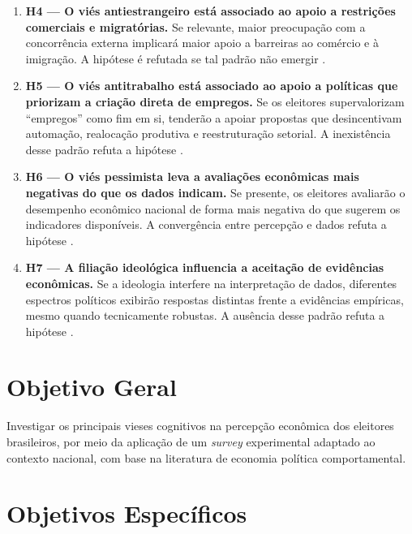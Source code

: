 \begin{enumerate}[label=\alph*)]
  \item \textbf{H4 — O viés antiestrangeiro está associado ao apoio a restrições comerciais e migratórias.}
  Se relevante, maior preocupação com a concorrência externa implicará maior apoio a barreiras ao comércio e à imigração. A hipótese é refutada se tal padrão não emergir \cite{The_Myth_of_the_Rational_Voter,bhagwati2003free}.

  \item \textbf{H5 — O viés antitrabalho está associado ao apoio a políticas que priorizam a criação direta de empregos.}
  Se os eleitores supervalorizam “empregos” como fim em si, tenderão a apoiar propostas que desincentivam automação, realocação produtiva e reestruturação setorial. A inexistência desse padrão refuta a hipótese \cite{The_Myth_of_the_Rational_Voter,landsburg2012armchair}.

  \item \textbf{H6 — O viés pessimista leva a avaliações econômicas mais negativas do que os dados indicam.}
  Se presente, os eleitores avaliarão o desempenho econômico nacional de forma mais negativa do que sugerem os indicadores disponíveis. A convergência entre percepção e dados refuta a hipótese \cite{The_Myth_of_the_Rational_Voter,easterbrook2004progress}.

  \item \textbf{H7 — A filiação ideológica influencia a aceitação de evidências econômicas.}
  Se a ideologia interfere na interpretação de dados, diferentes espectros políticos exibirão respostas distintas frente a evidências empíricas, mesmo quando tecnicamente robustas. A ausência desse padrão refuta a hipótese \cite{The_Myth_of_the_Rational_Voter,kahan2012polarization}.

\end{enumerate}

\section{Objetivo Geral}\label{sec:objetivo-geral}

Investigar os principais vieses cognitivos na percepção econômica dos eleitores brasileiros, por meio da aplicação de um \textit{survey} experimental adaptado ao contexto nacional, com base na literatura de economia política comportamental.

\section{Objetivos Específicos}\label{sec:objetivos-especificos}

